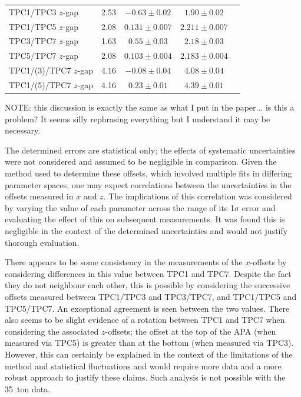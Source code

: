 \begin{table}
\begin{tabular}{l  c  c  c  c }
      \midrule
      TPC1/TPC3 $z$-gap & 2.53 & $-0.63 \pm 0.02$  & $1.90 \pm 0.02$   \\
      TPC1/TPC5 $z$-gap & 2.08 & $0.131 \pm 0.007$ & $2.211 \pm 0.007$ \\
      TPC3/TPC7 $z$-gap & 1.63 & $0.55 \pm 0.03$   & $2.18 \pm 0.03$   \\
      TPC5/TPC7 $z$-gap & 2.08 & $0.103 \pm 0.004$ & $2.183 \pm 0.004$ \\
      \midrule
      TPC1/(3)/TPC7 $z$-gap & 4.16 & $-0.08 \pm 0.04$ & $4.08 \pm 0.04$ \\
      TPC1/(5)/TPC7 $z$-gap & 4.16 & $0.23 \pm 0.01$ & $4.39 \pm 0.01$ \\
      \bottomrule
    \end{tabular}
\end{table}

{\color{red} NOTE: this discussion is exactly the same as what I put in the paper... is this a problem?  It seems silly rephrasing everything but I understand it may be necessary.}

The determined errors are statistical only; the effects of systematic uncertainties were not considered and assumed to be negligible in comparison.  Given the method used to determine these offsets, which involved multiple fits in differing parameter spaces, one may expect correlations between the uncertainties in the offsets measured in $x$ and $z$.  The implications of this correlation was considered by varying the value of each parameter across the range of its 1$\sigma$ error and evaluating the effect of this on subsequent measurements.  It was found this is negligible in the context of the determined uncertainties and would not justify thorough evaluation.

There appears to be some consistency in the measurements of the $x$-offsets by considering differences in this value between TPC1 and TPC7.  Despite the fact they do not neighbour each other, this is possible by considering the successive offsets measured between TPC1/TPC3 and TPC3/TPC7, and TPC1/TPC5 and TPC5/TPC7.  An exceptional agreement is seen between the two values.  There also seems to be slight evidence of a rotation between TPC1 and TPC7 when considering the associated $z$-offsets; the offset at the top of the APA (when measured via TPC5) is greater than at the bottom (when measured via TPC3).  However, this can certainly be explained in the context of the limitations of the method and statistical fluctuations and would require more data and a more robust approach to justify these claims.  Such analysis is not possible with the 35~ton data.

